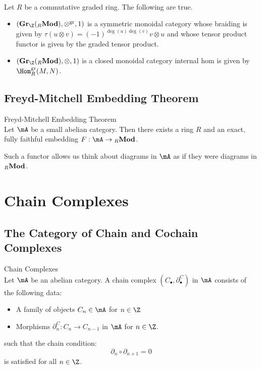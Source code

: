 \documentclass[a4paper]{article}
\begin{document}
\begin{prp}{}{}\\
Let $R$ be a commutative graded ring. The following are true. 
\begin{itemize}
\item $(\bold{Gr}_\Z({_R\bold{Mod}}),\otimes^\text{gr},1)$ is a symmetric monoidal category whose braiding is given by $\tau(u\otimes v)=(-1)^{\deg(u)\deg(v)}v\otimes u$ and whose tensor product functor is given by the graded tensor product. 
\item $(\bold{Gr}_\Z({_R\bold{Mod}}),\otimes,1)$ is a closed monoidal category internal hom is given by $\Hom_R^\text{gr}(M,N)$. 
\end{itemize}
\end{prp}

\subsection{Freyd-Mitchell Embedding Theorem}
\begin{thm}{Freyd-Mitchell Embedding Theorem}{}\\
Let $\mA$ be a small abelian category. Then there exists a ring $R$ and an exact, fully faithful embedding $F:\mA\to{_R\bold{Mod}}$. 
\end{thm}

Such a functor allows us think about diagrams in $\mA$ as if they were diagrams in ${_R\bold{Mod}}$. 

\pagebreak
\section{Chain Complexes}
\subsection{The Category of Chain and Cochain Complexes}
\begin{defn}{Chain Complexes}{}\\
Let $\mA$ be an abelian category. A chain complex $(C_\bullet,\partial_\bullet^C)$ in $\mA$ consists of the following data: 
\begin{itemize}
\item A family of objects $C_n\in\mA$ for $n\in\Z$
\item Morphisms $\partial_n^C:C_n\to C_{n-1}$ in $\mA$ for $n\in\Z$. 
\end{itemize}
such that the chain condition: $$\partial_n\circ\partial_{n+1}=0$$ is satisfied for all $n\in\Z$. 
\end{defn}
\end{document}
